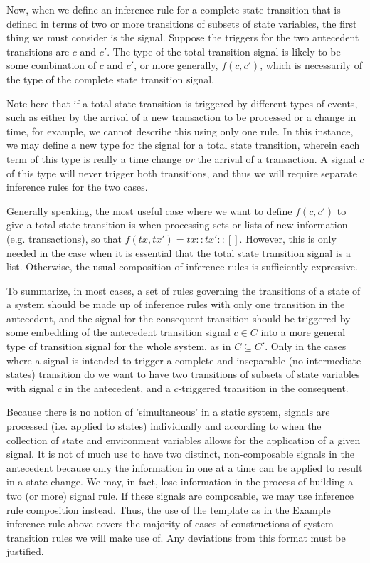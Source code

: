 \documentclass[11pt,a4paper]{article}
\theoremstyle{definition}
\theoremstyle{remark}
\begin{document}
Now, when we define an inference rule for a complete state transition that
is defined in terms of two or more transitions of subsets of state variables,
the first thing we must consider is the signal. Suppose the triggers for the
two antecedent transitions are $c$ and $c'$. The type of the total transition
signal is likely to be some combination of $c$ and $c'$, or more generally,
$f(c,c')$, which is necessarily of the type of the complete state transition
signal.

Note here that if a total state transition is triggered by different types of
events, such as either by the arrival of
a new transaction to be processed or a change in time, for example, we cannot
describe this using only one rule. In this instance, we may define a new type
for the signal for a total state transition, wherein each term of this type is
really a time change \textit{or} the arrival of a transaction. A signal $c$
of this type will never trigger both transitions, and thus we will require
separate inference rules for the two cases.

Generally speaking, the most useful case where we want to define $f(c,c')$ to give
a total state transition is when processing sets or lists of new information
(e.g. transactions), so that $f(tx, tx') = tx :: tx' :: []$. However, this is
only needed in the case when it is essential that the total state transition
signal is a list.
Otherwise, the usual composition of inference rules is sufficiently expressive.

To summarize, in most cases, a set of rules governing the transitions of a
state of a system should be made up of inference rules with only one
transition in the antecedent, and the signal for the consequent transition
should be triggered by some embedding of the antecedent transition signal $c \in C$
into a more general type of transition signal for the whole system, as in
$C \subseteq C'$. Only in the cases where a signal is intended to trigger a
complete and inseparable (no intermediate states) transition do we want to
have two transitions of subsets of state variables with signal $c$ in the antecedent,
and a $c$-triggered transition in the consequent.

Because there is no notion of 'simultaneous' in a static system, signals
are processed (i.e. applied to states) individually and according to when
the collection of state and environment variables allows for the application
of a given signal. It is
not of much use to have two distinct, non-composable signals in the antecedent
because only the information in one at a time can be applied to result in a state change.
We may, in fact, lose information in the process of building a two (or more) signal rule.
If these signals are composable, we may use inference rule composition instead.
Thus, the use of the template as in the Example inference rule above covers
the majority of cases of constructions of system transition rules we will
make use of. Any deviations from this format must be justified.
\end{document}
